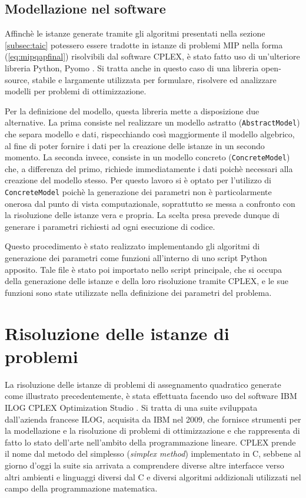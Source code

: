 \subsection{Modellazione nel software}
Affinchè le istanze generate tramite gli algoritmi presentati nella sezione \ref{subsec:taic} potessero essere tradotte in istanze di 
problemi MIP nella forma (\ref{eq:mipqapfinal}) risolvibili dal software CPLEX, è stato fatto uso di un'ulteriore libreria Python, 
Pyomo \cite{bynum2021pyomo}\cite{hart2011pyomo}. Si tratta anche in questo caso di una libreria open-source, stabile e largamente utilizzata 
per formulare, risolvere ed analizzare modelli per problemi di ottimizzazione.

Per la definizione del modello, questa libreria mette a disposizione due alternative. La prima consiste nel realizzare un modello astratto 
(\texttt{AbstractModel}) che separa modello e dati, rispecchiando così maggiormente il modello algebrico, al fine di poter fornire i dati 
per la creazione delle istanze in un secondo momento. La seconda invece, consiste in un modello concreto (\texttt{ConcreteModel}) che, a differenza del primo, 
richiede immediatamente i dati poichè necessari alla creazione del modello stesso. Per questo lavoro si è optato per l'utilizzo di \texttt{ConcreteModel} poichè la generazione dei parametri 
non è particolarmente onerosa dal punto di vista computazionale, soprattutto se messa a confronto con la risoluzione delle istanze vera e 
propria. La scelta presa prevede dunque di generare i parametri richiesti ad ogni esecuzione di codice. 

Questo procedimento è stato realizzato implementando gli algoritmi di generazione dei parametri come funzioni all'interno di uno script 
Python apposito. Tale file è stato poi importato nello script principale, che si occupa della generazione delle istanze e della loro risoluzione 
tramite CPLEX, e le sue funzioni sono state utilizzate nella definizione dei parametri del problema.




\section{Risoluzione delle istanze di problemi}
La risoluzione delle istanze di problemi di assegnamento quadratico generate come illustrato precedentemente, è stata effettuata facendo uso del software IBM ILOG CPLEX 
Optimization Studio \cite{cplex}. Si tratta di una suite sviluppata dall'azienda francese ILOG, acquisita da IBM nel 2009, che fornisce strumenti 
per la modellazione e la risoluzione di problemi di ottimizzazione e che rappresenta di fatto lo stato dell'arte nell'ambito della 
programmazione lineare. CPLEX prende il nome dal metodo del simplesso (\textit{simplex method}) implementato in C, sebbene al giorno d'oggi 
la suite sia arrivata a comprendere diverse altre interfacce verso altri ambienti e linguaggi diversi dal C e diversi algoritmi addizionali 
utilizzati nel campo della programmazione matematica.

